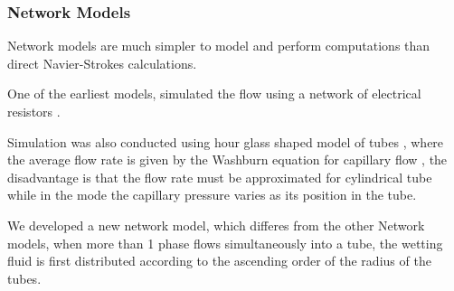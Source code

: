 	
	\subsubsection{Network Models}
		Network models are much simpler to model and perform computations than direct Navier-Strokes calculations.
		
		One of the earliest models, simulated the flow using a network of electrical resistors \cite{fatt1956network}.
		
		Simulation was also conducted using hour glass shaped model of tubes \cite{aker1998two}, where the average flow rate is given by the Washburn equation for capillary flow \cite{washburn1921dynamics}, the disadvantage is that the flow rate must be approximated for cylindrical tube while in the mode the capillary pressure varies as its position in the tube. 
	
		We developed a new network model, which differes from the other Network models, when more than 1 phase flows simultaneously into a tube, the wetting fluid is first distributed according to the ascending order of the radius of the tubes. 
